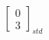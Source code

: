 \documentclass[preview]{standalone}
\begin{document}
\begin{align*}
\begin{bmatrix} 0 \\ 3 \end{bmatrix}_{std}
\end{align*}
\end{document}
